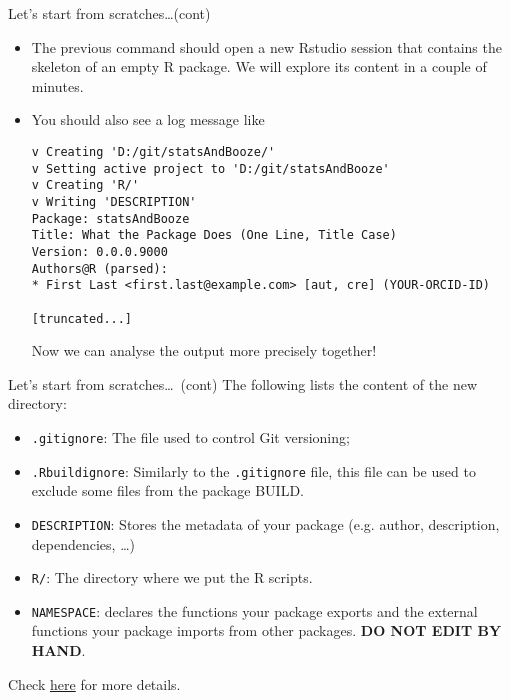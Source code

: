 \documentclass[
hyperref={bookmarks=false},
xcolor={dvipsnames,svgnames*,x11names*}, 
12pt
]{beamer}
\begin{document}
\begin{frame}[fragile]{Let's start from scratches\dots\;(cont)}
\vspace{-0.5cm}
\begin{itemize}
\itemsep 1ex
\item The previous command should open a new Rstudio session that contains the skeleton of an empty R package. We will explore its content in a couple of minutes.  
\item You should also see a log message like
\begin{lstlisting}
v Creating 'D:/git/statsAndBooze/'
v Setting active project to 'D:/git/statsAndBooze'
v Creating 'R/'
v Writing 'DESCRIPTION'
Package: statsAndBooze
Title: What the Package Does (One Line, Title Case)
Version: 0.0.0.9000
Authors@R (parsed):
* First Last <first.last@example.com> [aut, cre] (YOUR-ORCID-ID)

[truncated...]
\end{lstlisting}
Now we can analyse the output more precisely together! 
\end{itemize}
\end{frame}

\begin{frame}{Let's start from scratches\dots\, (cont)}
\vspace{-0.5cm}
The following lists the content of the new directory: 
\begin{itemize}
\item \texttt{.gitignore}: The file used to control Git versioning; 
\item \texttt{.Rbuildignore}: Similarly to the \texttt{.gitignore} file, this file can be used to exclude some files from the package BUILD. 
\item \texttt{DESCRIPTION}: Stores the metadata of your package (e.g. author, description, dependencies, \dots)
\item \texttt{R/}: The directory where we put the R scripts. 
\item \texttt{NAMESPACE}: declares the functions your package exports and the external functions your package imports from other packages. \textbf{DO NOT EDIT BY HAND}. 
\end{itemize}
Check \href{https://r-pkgs.org/whole-game.html\#create_package}{here} for more details. 
\end{frame}
\end{document}
